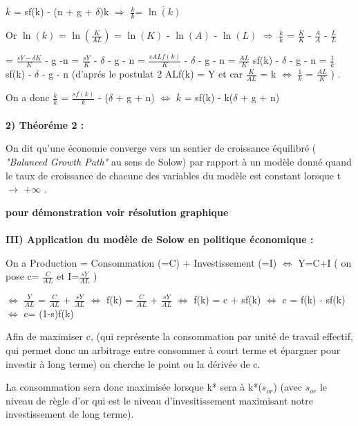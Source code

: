 \documentclass{article}
\begin{document}
$\stackrel{.}{k}$ = sf(k) - (n + g + $\delta$)k $\Rightarrow$  $\frac{\stackrel{.}{k}}{k}$= $\stackrel{.}{\ln (k)}$

Or $\ln (k)$ = $\ln (\frac{K}{AL})$ = $\ln(K)$ - $\ln (A)$ - $\ln (L)$ $\Rightarrow$ $\frac{\stackrel{.}{k}}{k}$ = $\frac{\stackrel{.}{K}}{K}$ - $\frac{\stackrel{.}{A}}{A}$ - $\frac{\stackrel{.}{L}}{L}$ 

= $\frac{sY - \delta K}{K}$ - g -n = $\frac{sY}{K}$ - $\delta$ - g - n = $\frac{sALf(k)}{K}$ - $\delta$ - g - n = $\frac{AL}{K}$ sf(k) - $\delta$ - g - n = $\frac{1}{k}$ sf(k) - $\delta$ - g - n  (d'aprés le postulat 2 ALf(k) = Y et car $\frac{K}{AL}$ = k $\Leftrightarrow$ $\frac{1}{k}$ = $\frac{AL}{K}$ ) .

On a donc $\frac{\stackrel{.}{k}}{k}$ = $\frac{sf(k)}{k}$ - ($\delta$ + g + n) $\Leftrightarrow$ $\stackrel{.}{k}$ = sf(k) - k($\delta$ + g + n)
\\\\
\textbf{ 2) Théoréme 2 : }

On dit qu'une économie converge vers un sentier de croissance équilibré (\textit{ "Balanced Growth Path"} au sens de Solow) par rapport à un modèle donné quand le taux de croissance de chacune des variables du modèle est constant lorsque t $\longrightarrow$ +$\infty$ .

\textbf{ pour démonstration voir résolution graphique }
\\\\
\textbf{III) Application du modèle de Solow en politique économique : }

On a Production = Consommation (=C) + Investissement (=I) $\Leftrightarrow$ Y=C+I ( on pose c= $\frac{C}{AL}$ et I=$\frac{sY}{AL}$ ) 

$\Leftrightarrow$ $\frac{Y}{AL}$ =  $\frac{C}{AL}$ + $\frac{sY}{AL}$ $\Leftrightarrow$ f(k) = $\frac{C}{AL}$ + $\frac{sY}{AL}$ $\Leftrightarrow$ f(k) = c + sf(k) $\Leftrightarrow$ c = f(k) - sf(k) $\Leftrightarrow$ c= (1-s)f(k)

Afin de maximiser c, (qui représente la consommation par unité de travail effectif, qui permet donc un arbitrage entre consommer à court terme et épargner pour investir à long terme) on cherche le point ou la dérivée de c.

La consommation sera donc maximisée lorsque k* sera à k*($s_{or}$) (avec $s_{or}$ le niveau de règle d'or qui est le niveau d'invesitissement maximisant notre investissement de long terme).
\end{document}
